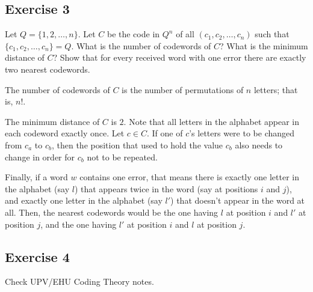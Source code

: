 \subsection{Exercise 3}

\begin{formulationBox}
	Let $Q = \{1,2,\hdots,n\}$. Let $C$ be the code in $Q^n$ of all $(c_1, c_2, \hdots, c_n)$ such that $\{c_1, c_2, \hdots, c_n\} = Q$. What is the number of codewords of $C$? What is the minimum distance of $C$? Show that for every received word with one error there are exactly two nearest codewords.
\end{formulationBox}

The number of codewords of $C$ is the number of permutations of $n$ letters; that is, $n!$.

The minimum distance of $C$ is $2$. Note that all letters in the alphabet appear in each codeword exactly once. Let $c \in C$. If one of $c$'s letters were to be changed from $c_a$ to $c_b$, then the position that used to hold the value $c_b$ also needs to change in order for $c_b$ not to be repeated.

Finally, if a word $w$ contains one error, that means there is exactly one letter in the alphabet (say $l$) that appears twice in the word (say at positions $i$ and $j$), and exactly one letter in the alphabet (say $l'$) that doesn't appear in the word at all. Then, the nearest codewords would be the one having $l$ at position $i$ and $l'$ at position $j$, and the one having $l'$ at position $i$ and $l$ at position $j$.

\subsection{Exercise 4}

Check UPV/EHU Coding Theory notes.
